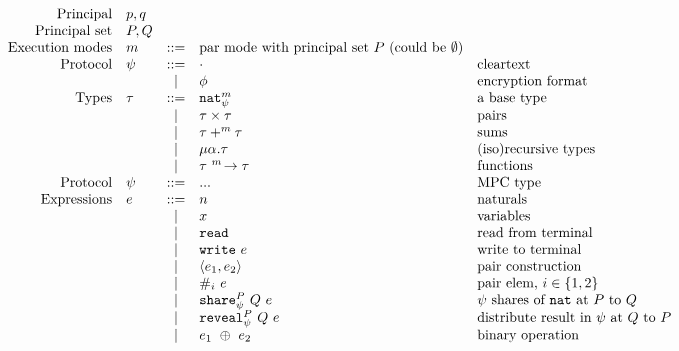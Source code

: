 \documentclass[10pt]{article}
\newcommand{\kw}[1]{\ensuremath{\mathtt{#1}}}
\newcommand{\tnat}{\ensuremath{\mathtt{nat}}}
\newcommand{\tfun}[3]{\ensuremath{{#1} ~^{#3}\!\rightarrow {#2}}}
\newcommand{\tprod}[2]{\ensuremath{{#1} \times {#2}}}
\newcommand{\tsum}[3]{\ensuremath{{#1} +^{#3} {#2}}}
\newcommand{\trec}[2]{\ensuremath{\mu {#1}.{#2}}}
\newcommand{\ebinop}[2]{\ensuremath{{#1}~\oplus~{#2}}}
\newcommand{\ereveal}[4]{\ensuremath{\kw{reveal}^{#1}_{#4}~{#2}~{#3}}}
\newcommand{\eshare}[4]{\ensuremath{\kw{share}^{#2}_{#1}~{#3}~{#4}}}
\newcommand{\eread}{\ensuremath{\kw{read}}}
\newcommand{\ewrite}[1]{\ensuremath{\kw{write}~{#1}}}
\newcommand{\epair}[2]{\ensuremath{\langle {#1}, {#2} \rangle}}
\newcommand{\eproj}[2]{\ensuremath{\kw{\#}}_{#1}~{#2}}
\begin{document}
\begin{figure}[h]
  \centering
  \[\begin{array}{rlcll}
      \text{Principal} & p, q \\
      \text{Principal set} & P, Q \\
    \text{Execution modes} & m  & ::=  & \text{par mode with principal set $P$ (could be $\emptyset$)} \\
      \text{Protocol} & \psi & ::= & \cdot & \text{cleartext} \\
                       && \mid & \phi & \text{encryption format} \\
      \text{Types} & \tau & ::=  & \tnat^m_\psi & \text{a base type} \\
                       && \mid & \tprod{\tau}{\tau} & \text{pairs} \\
                       && \mid & \tsum{\tau}{\tau}{m} & \text{sums} \\
                       && \mid & \trec{\alpha}{\tau} & \text{(iso)recursive types} \\
                       && \mid & \tfun{\tau}{\tau}{m} & \text{functions} \\
      \text{Protocol} & \psi & ::= & ... & \text{MPC type} \\
      \text{Expressions} & e & ::= & n & \text{naturals} \\
                       && \mid & x & \text{variables} \\
                       && \mid & \eread & \text{read from terminal}\\
                       && \mid & \ewrite{e} & \text{write to terminal}\\
                       && \mid & \epair{e_1}{e_2} & \text{pair construction}\\
                       && \mid & \eproj{i}{e} & \text{pair elem, }i \in \{1,2\}\\
                       && \mid & \eshare{\psi}{P}{Q}{e} & \text{$\psi$ shares of {\tnat} at $P$ to $Q$} \\
                       && \mid & \ereveal{P}{Q}{e}{\psi} & \text{distribute result in $\psi$ at $Q$ to $P$}\\
                       && \mid & \ebinop{e_1}{e_2}  & \text{binary operation} \\

\end{array}\]
\end{figure}
\end{document}
